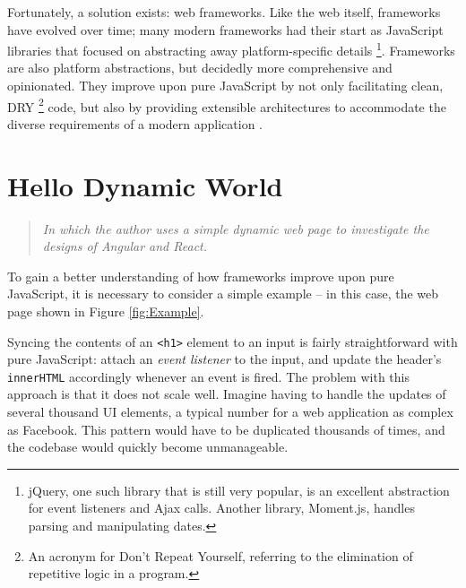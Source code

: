 \documentclass[12pt,letterpaper]{article}
\begin{document}
Fortunately, a solution exists: web frameworks. Like the web itself, frameworks have evolved over time; many modern frameworks had their start as JavaScript libraries that focused on abstracting away platform-specific details \footnote{jQuery, one such library that is still very popular, is an excellent abstraction for event listeners and Ajax calls. Another library, Moment.js, handles parsing and manipulating dates.}. Frameworks are also platform abstractions, but decidedly more comprehensive and opinionated. They improve upon pure JavaScript by not only facilitating clean, DRY \footnote{An acronym for Don't Repeat Yourself, referring to the elimination of repetitive logic in a program.} code, but also by providing extensible architectures to accommodate the diverse requirements of a modern application \cite{Schlensker:2014}.


\section{Hello Dynamic World}
\vspace{-12pt}

\begin{quote}
	\singlespacing
	\emph{In which the author uses a simple dynamic web page to investigate the designs of Angular and React.}
\end{quote}

To gain a better understanding of how frameworks improve upon pure JavaScript, it is necessary to consider a simple example -- in this case, the web page shown in Figure \ref{fig:Example}.

\begin{SCfigure}[][h]
	\centering
	\caption{A simple example of a dynamic web element: the header text changes based on user input. Code for this example in pure JavaScript, as well as using the Angular and React frameworks, can be found in Appendix \ref{app:code}.}
	\label{fig:Example}
\end{SCfigure}

Syncing the contents of an \texttt{<h1>} element to an input is fairly straightforward with pure JavaScript: attach an \emph{event listener} to the input, and update the header's \texttt{innerHTML} accordingly whenever an event is fired. The problem with this approach is that it does not scale well. Imagine having to handle the updates of several thousand UI elements, a typical number for a web application as complex as Facebook. This pattern would have to be duplicated thousands of times, and the codebase would quickly become unmanageable.
\end{document}
